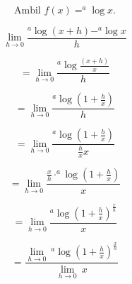 \documentclass{article}
\begin{document}
\begin{eulernotebook}
\begin{eulercomment}
\begin{eulercomment}
\begin{eulercomment}
\begin{eulercomment}
\begin{eulercomment}
\begin{eulercomment}
\begin{eulercomment}
\end{eulercomment}
\begin{eulerformula}
\[
\text{Ambil $f(x)=^a\log x$.}
\]
\end{eulerformula}
\begin{eulercomment}
\end{eulercomment}
\begin{eulerformula}
\[
\text{$\lim_{h\to 0} \frac{^a\log (x+h)-^a\log x}{h}$}
\]
\end{eulerformula}
\begin{eulercomment}
\end{eulercomment}
\begin{eulerformula}
\[
\text{$=\lim _{h\to 0} \frac{^a\log \frac{(x+h)}{x}}{h}$}
\]
\end{eulerformula}
\begin{eulercomment}
\end{eulercomment}
\begin{eulerformula}
\[
\text{$=\lim_{h\to 0} \frac{^a\log (1+\frac{h}{x})}{h}$}
\]
\end{eulerformula}
\begin{eulercomment}
\end{eulercomment}
\begin{eulerformula}
\[
\text{$=\lim_{h\to 0} \frac{^a\log (1+\frac{h}{x})}{\frac{h}{x}x}$}
\]
\end{eulerformula}
\begin{eulercomment}
\end{eulercomment}
\begin{eulerformula}
\[
\text{$=\lim_{h\to 0} \frac{\frac{x}{h}\cdot ^a\log (1+\frac{h}{x})}{x}$}
\]
\end{eulerformula}
\begin{eulercomment}
\end{eulercomment}
\begin{eulerformula}
\[
\text{$=\lim_{h\to 0} \frac{^a\log (1+\frac{h}{x})^\frac{x}{h}}{x}$}
\]
\end{eulerformula}
\begin{eulercomment}
\end{eulercomment}
\begin{eulerformula}
\[
\text{$=\frac{\lim_{h\to 0}\: ^a\log (1+\frac{h}{x})^\frac{x}{h}}{\lim _{h\to 0}\: x}$}
\]
\end{eulerformula}
\begin{eulercomment}

\end{eulercomment}
\end{eulercomment}
\end{eulercomment}
\end{eulercomment}
\end{eulercomment}
\end{eulercomment}
\end{eulercomment}
\end{eulernotebook}
\end{document}
